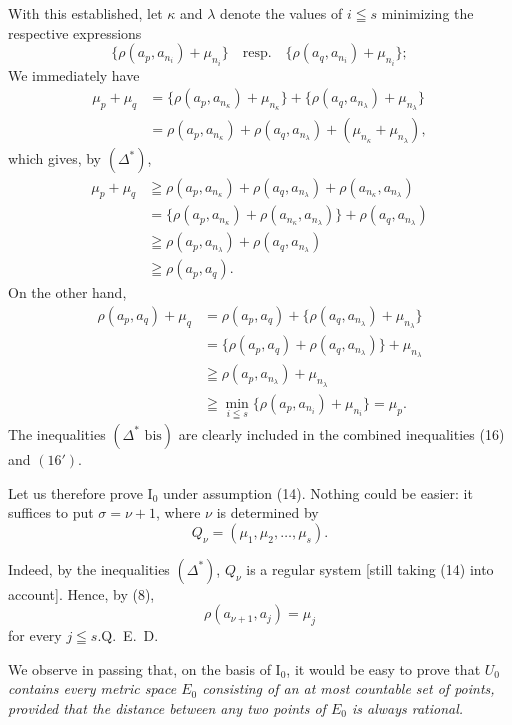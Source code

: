 \documentclass[a4paper,12pt]{amsart}
\newcommand{\srcpage}[1]{} %
\begin{document}
With this established, let $\kappa$ and $\lambda$ denote the values of $i\leqq s$ minimizing the respective expressions
\[
\{\rho(a_p,a_{n_i})+\mu_{n_i}\}\quad\text{resp.}\quad\{\rho(a_q,a_{n_i})+\mu_{n_i}\};
\]
We immediately have
\[
\begin{aligned}
\mu_p+\mu_q&=\{\rho(a_p,a_{n_\kappa})+\mu_{n_\kappa}\}+\{\rho(a_q,a_{n_\lambda})+\mu_{n_\lambda}\}\\
&=\rho(a_p,a_{n_\kappa})+\rho(a_q,a_{n_\lambda})+(\mu_{n_\kappa}+\mu_{n_\lambda}),
\end{aligned}
\]
which gives, by $(\Delta^*)$,
\begin{equation}\tag{16}
\begin{aligned}
\mu_p+\mu_q&\geqq\rho(a_p,a_{n_\kappa})+\rho(a_q,a_{n_\lambda})+\rho(a_{n_\kappa},a_{n_\lambda})\\
&=\{\rho(a_p,a_{n_\kappa})+\rho(a_{n_\kappa},a_{n_\lambda})\}+\rho(a_q,a_{n_\lambda})\\
&\geqq\rho(a_p,a_{n_\lambda})+\rho(a_q,a_{n_\lambda})\\
&\geqq\rho(a_p,a_q).
\end{aligned}
\end{equation}
On the other hand,
\begin{equation}\tag{$16'$}
\begin{aligned}
\rho(a_p,a_q)+\mu_q&=\rho(a_p,a_q)+\{\rho(a_q,a_{n_\lambda})+\mu_{n_\lambda}\}\\
&=\{\rho(a_p,a_q)+\rho(a_q,a_{n_\lambda})\}+\mu_{n_\lambda}\\
&\geqq\rho(a_p,a_{n_\lambda})+\mu_{n_\lambda}\\
&\geqq\min_{i\leqq s}\{\rho(a_p,a_{n_i})+\mu_{n_i}\}=\mu_p.
\end{aligned}
\end{equation}
The inequalities $(\Delta^*\text{ bis})$ are clearly included in the combined inequalities (16) and $(16')$.

Let us therefore prove I$_0$ under assumption (14). Nothing could be easier: it suffices to put $\sigma=\nu+1$, where $\nu$ is determined by
\[
Q_\nu=(\mu_1,\mu_2,\dots,\mu_s).
\]
\srcpage{58}
Indeed, by the inequalities $(\Delta^*)$, $Q_\nu$ is a regular system [still taking (14) into account]. Hence, by (8),
\[
\rho(a_{\nu+1},a_j)=\mu_j
\]
for every $j\leqq s$.\hfill \mbox{Q. E. D.}

We observe in passing that, on the basis of I$_0$, it would be easy to prove that \textit{$U_0$ contains every metric space $E_0$ consisting of an at most countable set of points, provided that the distance between any two points of $E_0$ is always rational.}
\end{document}
